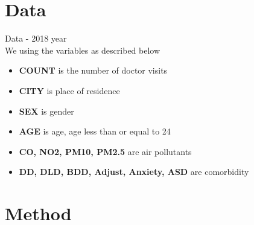 \documentclass[aspectratio=169,xcolor=dvipsnames]{beamer}
\begin{document}
	\section{Data}
	\begin{frame}{Data }
		 - 2018 year\\
		
		We using the variables as described below\\
		\begin{itemize}
			\item \textbf{\color{red}COUNT} is the number of doctor visits\\
			\item \textbf{CITY} is place of residence\\
			\item \textbf{SEX} is gender\\
			\item \textbf{AGE} is age, age less than or equal to 24\\
			\item \textbf{CO, NO2, PM10, PM2.5} are air pollutants\\
			\item \textbf{DD, DLD, BDD, Adjust, Anxiety, ASD} are comorbidity\\
		\end{itemize}
		
	\end{frame}
	
	\section{Method}
	
\end{document}

